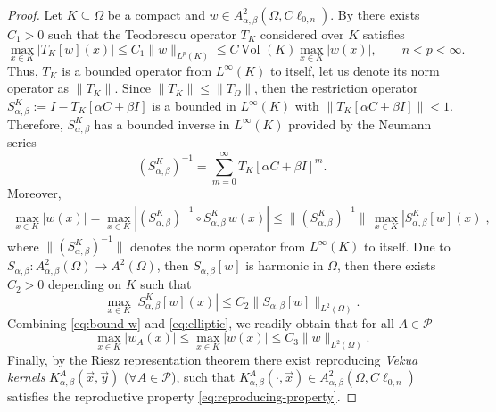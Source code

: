 \documentclass[12pt]{article}
\begin{document}
\begin{proof}
Let $K\subseteq \Omega$ be a compact and $w\in A_{\alpha,\beta}^2(\Omega,C\ell_{0,n})$. 
By \cite[Th.\ 3.14]{GuSpr1997} there exists $C_1>0$ such that the Teodorescu operator $T_K$ considered over $K$ satisfies
\[
   \max_{x\in K}|T_K[w](x)|\leq C_1 \|w\|_{L^p(K)}\leq C \,\text{Vol }(K)\max_{x\in K}|w(x)|, \qquad n<p<\infty.
\]
Thus, $T_K$ is a bounded operator from $L^{\infty}(K)$ to itself, let us denote its norm operator as $\|T_K\|$. Since $\|T_K\|\leq \|T_{\Omega}\|$, then the restriction operator $S_{\alpha,\beta}^K:=I-T_{K}[\alpha C+\beta I]$ is a bounded in $L^{\infty}(K)$ with $\|T_{K}[\alpha C+\beta I]\|<1$. Therefore, $S_{\alpha,\beta}^K$ has a bounded inverse in $L^{\infty}(K)$ provided by the Neumann series \cite{Kub2012}
\[
    (S_{\alpha,\beta}^K)^{-1}=\sum_{m=0}^{\infty} T_K[\alpha C+\beta I]^m.
\]
Moreover,
\begin{align}\label{eq:bound-w}
   \max_{x\in K}|w(x)|=\max_{x\in K}|(S_{\alpha,\beta}^K)^{-1}\circ S_{\alpha,\beta}^K\,w(x)|\leq \|(S_{\alpha,\beta}^K)^{-1}\|\, \max_{x\in K}|S_{\alpha,\beta}^K[w](x)|,
\end{align}
where $\|(S_{\alpha,\beta}^K)^{-1}\|$ denotes the norm operator from $L^{\infty}(K)$ to itself. Due to $S_{\alpha,\beta}\colon A^2_{\alpha,\beta}(\Omega)\to A^2(\Omega)$, then $S_{\alpha,\beta}[w]$ is harmonic in $\Omega$, then there exists $C_2>0$ depending on $K$ such that
\begin{equation}\label{eq:elliptic}
\max_{x\in K}|S_{\alpha,\beta}^K[w](x)|\leq C_2 \|S_{\alpha,\beta}[w]\|_{L^2(\Omega)}.
\end{equation}
Combining \eqref{eq:bound-w} and \eqref{eq:elliptic}, we readily obtain that for all $A\in \mathcal{P}$
\[
\max_{x\in K}|w_A(x)|\leq \max_{x\in K}|w(x)|\leq C_3 \|w\|_{L^2(\Omega)}.
\]
Finally, by the Riesz representation theorem \cite{Davis1975} there exist reproducing \textit{Vekua kernels} $K_{\alpha,\beta}^A(\vec x,\vec y)$ ($\forall A\in \mathcal{P}$), such that $K_{\alpha,\beta}^A(\cdot, \vec x)\in A_{\alpha,\beta}^2(\Omega,C\ell_{0,n})$ satisfies the reproductive property \eqref{eq:reproducing-property}.
\end{proof}
\end{document}

